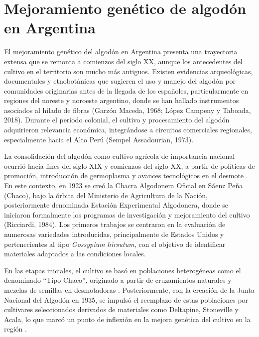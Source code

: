 \documentclass[12pt,oneside]{reedthesis}
\begin{document}
\section{Mejoramiento genético de algodón en Argentina}\label{mejoramiento-genuxe9tico-de-algoduxf3n-en-argentina}

El mejoramiento genético del algodón en Argentina presenta una trayectoria extensa que se remonta a comienzos del siglo XX, aunque los antecedentes del cultivo en el territorio son mucho más antiguos. Existen evidencias arqueológicas, documentales y etnobotánicas que sugieren el uso y manejo del algodón por comunidades originarias antes de la llegada de los españoles, particularmente en regiones del noreste y noroeste argentino, donde se han hallado instrumentos asociados al hilado de fibras (Garzón Maceda, 1968; López Campeny y Taboada, 2018). Durante el período colonial, el cultivo y procesamiento del algodón adquirieron relevancia económica, integrándose a circuitos comerciales regionales, especialmente hacia el Alto Perú (Sempel Assadourian, 1973).

La consolidación del algodón como cultivo agrícola de importancia nacional ocurrió hacia fines del siglo XIX y comienzos del siglo XX, a partir de políticas de promoción, introducción de germoplasma y avances tecnológicos en el desmote \autocite{guy2000}. En este contexto, en 1923 se creó la Chacra Algodonera Oficial en Sáenz Peña (Chaco), bajo la órbita del Ministerio de Agricultura de la Nación, posteriormente denominada Estación Experimental Algodonera, donde se iniciaron formalmente los programas de investigación y mejoramiento del cultivo (Ricciardi, 1984). Los primeros trabajos se centraron en la evaluación de numerosas variedades introducidas, principalmente de Estados Unidos y pertenecientes al tipo \emph{Gossypium hirsutum}, con el objetivo de identificar materiales adaptados a las condiciones locales.

En las etapas iniciales, el cultivo se basó en poblaciones heterogéneas como el denominado ``Tipo Chaco'', originado a partir de cruzamientos naturales y mezclas de semillas en desmotadoras \autocite{poisson2002}. Posteriormente, con la creación de la Junta Nacional del Algodón en 1935, se impulsó el reemplazo de estas poblaciones por cultivares seleccionados derivados de materiales como Deltapine, Stoneville y Acala, lo que marcó un punto de inflexión en la mejora genética del cultivo en la región \autocite{gómez2007}.
\end{document}
